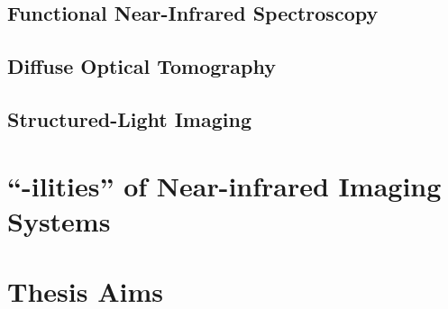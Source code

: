 \subsection{Functional Near-Infrared Spectroscopy}
\subsection{Diffuse Optical Tomography}
\subsection{Structured-Light Imaging}



\section{``-ilities'' of Near-infrared Imaging Systems}
\label{chap:background:ilities}



\section{Thesis Aims}
\label{chap:background:aims}


